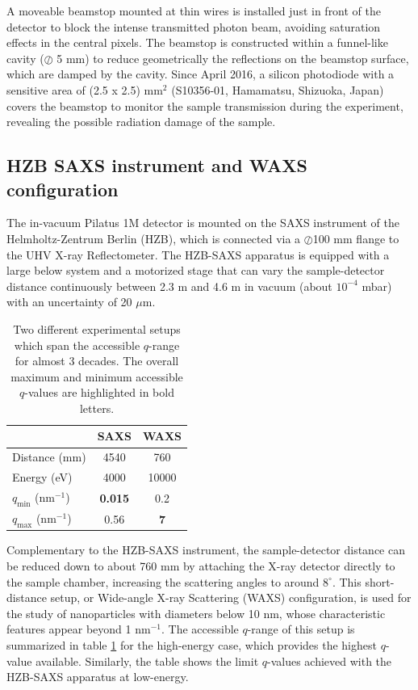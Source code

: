 A moveable beamstop mounted at thin wires is installed just in front of the detector to block the intense transmitted photon beam, avoiding saturation effects in the central pixels. The beamstop is constructed within a funnel-like cavity ($\oslash$ 5 mm) to reduce geometrically the reflections on the beamstop surface, which are damped by the cavity. Since April 2016, a silicon photodiode with a sensitive area of (2.5 x 2.5) mm$^2$ (S10356-01, Hamamatsu, Shizuoka, Japan) covers the beamstop to monitor the sample transmission during the experiment, revealing the possible radiation damage of the sample.

\subsection{HZB SAXS instrument and WAXS configuration}
\label{sec:WAXS_experimental}

The in-vacuum Pilatus 1M detector is mounted on the SAXS instrument of the Helmholtz-Zentrum Berlin (HZB), which is connected via a $\oslash$100 mm flange to the UHV X-ray Reflectometer. The HZB-SAXS apparatus is equipped with a large below system and a motorized stage that can vary the sample-detector distance continuously between 2.3 m and 4.6 m in vacuum (about $10^{-4}$ mbar) with an uncertainty of 20 $\mu$m. 

\begin{table}[]
\centering
\caption[Two different SAXS experimental setups and the accessible $q$-range.]{Two different experimental setups which span the accessible $q$-range for almost 3 decades. The overall maximum and minimum accessible $q$-values are highlighted in bold letters.}
\label{tab:qrange}
\begin{tabular}{|l|c|c|}
\hline
              & \textbf{SAXS} & \textbf{WAXS} \\ \hline
Distance (mm) & 4540          & 760           \\ \hline
Energy (eV)   & 4000          & 10000         \\ \hline
$q_{\text{min}}$ (nm$^{-1}$)   & \textbf{0.015}         & 0.2          \\ \hline
$q_{\text{max}}$ (nm$^{-1}$)   & 0.56             & \textbf{7}             \\ \hline
\end{tabular}
\end{table}

Complementary to the HZB-SAXS instrument, the sample-detector distance can be reduced down to about 760 mm by attaching the X-ray detector directly to the sample chamber, increasing the scattering angles to around $8^{\circ}$. This short-distance setup, or Wide-angle X-ray Scattering (WAXS) configuration, is used for the study of nanoparticles with diameters below 10 nm, whose characteristic features appear beyond 1 nm$^{-1}$. The accessible $q$-range of this setup is summarized in table \ref{tab:qrange} for the high-energy case, which provides the highest $q$-value available. Similarly, the table shows the limit $q$-values achieved with the HZB-SAXS apparatus at low-energy.

